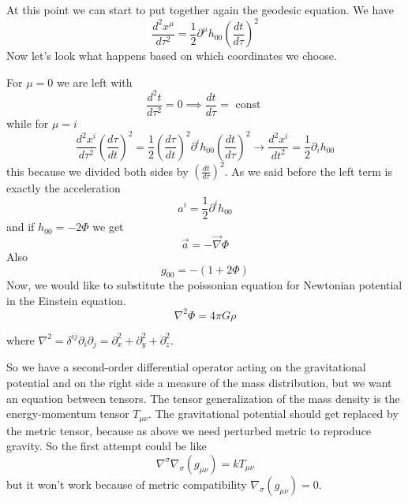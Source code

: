 At this point we can start to put together again the geodesic equation.
We have 
\begin{equation}
\frac{d ^{2}x^{\mu }}{d \tau ^{2}} = \frac{1}{2} \partial^{\mu }h_{00} \left( \frac{d t}{d \tau } \right)^{2}
\end{equation}
Now let's look what happens based on which coordinates we choose.\par
For $\mu  = 0$ we are left with
\[
\frac{d^{2}t }{d \tau ^{2} } = 0 \implies \frac{d t}{d \tau } = \text{ const }
\]
while for $\mu  = i$
\begin{equation}
\frac{d ^{2}x^{i}}{d \tau ^{2}} \left(\frac{d \tau }{d t} \right)^{2} = \frac{1}{2} \left( \frac{d \tau }{d t } \right)^{2}\partial^{i}h_{00}\left( \frac{d t}{d \tau } \right)^{2} \to  \frac{d ^{2}x^{i}}{d t^{2} } = \frac{1}{2}\partial_{i}h_{00}
\end{equation}
this because we divided both sides by $\left( \frac{d t}{d \tau }\right)^{2}$.
As we said before the left term is exactly the acceleration
\[
a^{i} = \frac{1}{2} \partial^{i}h_{00} 
\]
and if $h_{00} = -2\Phi $ we get
\begin{equation}
	\vec{a} = -\vec{\nabla } \Phi 
\end{equation}
Also
\[
g_{00} = -\left( 1+ 2\Phi  \right)
\]
Now, we would like to substitute the poissonian equation for Newtonian potential in the Einstein equation.
\[
\nabla^{2} \Phi = 4\pi G\rho 	
\]

where $\nabla ^{2} = \delta ^{ij}\partial_{i}\partial_{j}  = \partial^{2}_{x}+\partial^{2}_{y}+\partial^{2}_{z}$. 

So we have a second-order differential operator  acting on the  gravitational potential and on the right side a measure of the mass distribution, but we want an equation between tensors. The tensor generalization of the mass density is the energy-momentum tensor $T_{\mu \nu }$. The gravitational potential should get replaced by the metric tensor, because as above we need perturbed  metric to reproduce gravity. So the first attempt could be like
\[
\nabla ^{\sigma }\nabla _{\sigma }\left( g_{\mu \nu } \right) = k T_{\mu \nu }
\]
but it won't work because of metric compatibility $\nabla _{\sigma }\left( g_{\mu \nu } \right) = 0$.\par

